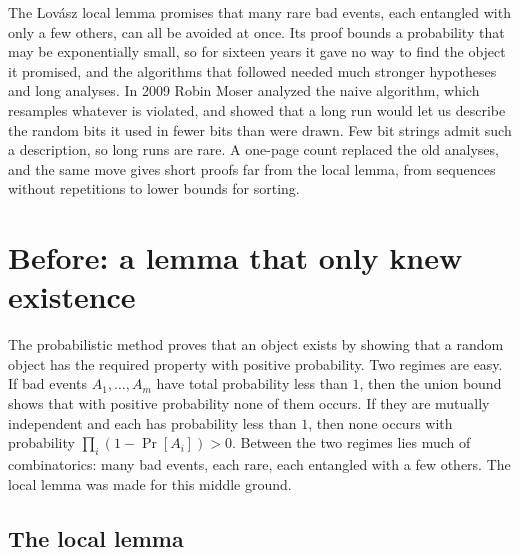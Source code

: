 \begin{refsection}

\newcommand{\compressionVbl}{\operatorname{vbl}}
\newcommand{\compressionFix}{\textsc{Fix}}
\newcommand{\compressionSolve}{\textsc{Solve}}
\newcommand{\compressionCat}[1]{\mathrm{Cat}_{#1}}
\newcommand{\compressionBin}{\operatorname{bin}}

\begin{chaptersummary}
The Lov\'asz local lemma promises that many rare bad events, each entangled with only a few others, can all be avoided at once. Its proof bounds a probability that may be exponentially small, so for sixteen years it gave no way to find the object it promised, and the algorithms that followed needed much stronger hypotheses and long analyses. In 2009 Robin Moser analyzed the naive algorithm, which resamples whatever is violated, and showed that a long run would let us describe the random bits it used in fewer bits than were drawn. Few bit strings admit such a description, so long runs are rare. A one-page count replaced the old analyses, and the same move gives short proofs far from the local lemma, from sequences without repetitions to lower bounds for sorting.
\end{chaptersummary}

\section{Before: a lemma that only knew existence}\label{sec:compression:before}

The probabilistic method proves that an object exists by showing that a random object has the required property with positive probability. Two regimes are easy. If bad events $A_1,\dots,A_m$ have total probability less than $1$, then the union bound shows that with positive probability none of them occurs. If they are mutually independent and each has probability less than $1$, then none occurs with probability $\prod_i(1-\Pr[A_i])>0$. Between the two regimes lies much of combinatorics: many bad events, each rare, each entangled with a few others. The local lemma was made for this middle ground.

\subsection{The local lemma}\label{sec:compression:lll}


\end{refsection}
